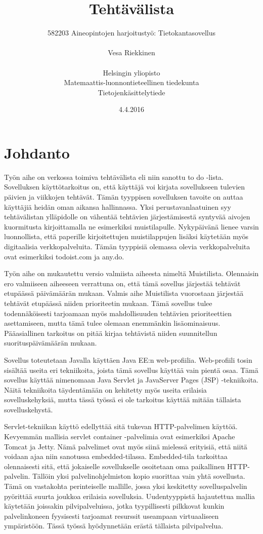\documentclass[12pt,a4paper,oneside,titlepage,pdftex]{article}
\title{Tehtävälista}
\date{4.4.2016}
\author{582203 Aineopintojen harjoitustyö: Tietokantasovellus\\ \\ Vesa Riekkinen\\ \\Helsingin yliopisto\\Matemaattis-luonnontieteellinen tiedekunta\\Tietojenkäsittelytiede}
\begin{document}
\maketitle

\setcounter{page}{1}
 
\section{Johdanto}

Työn aihe on verkossa toimiva tehtävälista eli niin sanottu to do -lista. Sovelluksen käyttötarkoitus on, että käyttäjä voi kirjata sovellukseen tulevien päivien ja viikkojen tehtävät. Tämän tyyppisen sovelluksen tavoite on auttaa käyttäjiä heidän oman aikansa hallinnassa. Yksi perustavanlaatuinen syy tehtävälistan ylläpidolle on vähentää tehtävien järjestämisestä syntyvää aivojen kuormitusta kirjoittamalla ne esimerkiksi muistilapulle. Nykypäivänä lienee varsin luonnollista, että paperille kirjoitettujen muistilappujen lisäksi käytetään myös digitaalisia verkkopalveluita. Tämän tyyppisiä olemassa olevia verkkopalveluita ovat esimerkiksi todoist.com ja any.do.

Työn aihe on mukautettu versio valmiista aiheesta nimeltä Muistilista. Olennaisin ero valmiiseen aiheeseen verrattuna on, että tämä sovellus järjestää tehtävät etupäässä päivämäärän mukaan. Valmis aihe Muistilista vuorostaan järjestää tehtävät etupäässä niiden prioriteetin mukaan. Tämä sovellus tulee todennäköisesti tarjoamaan myös mahdollisuuden tehtävien prioriteettien asettamiseen, mutta tämä tulee olemaan enemmänkin lisäominaisuus. Pääasiallinen tarkoitus on pitää kirjaa tehtävistä niiden suunnitellun suorituspäivämäärän mukaan.

Sovellus toteutetaan Javalla käyttäen Java EE:n web-profiilia. Web-profiili tosin sisältää useita eri tekniikoita, joista tämä sovellus käyttää vain pientä osaa. Tämä sovellus käyttää nimenomaan Java Servlet ja JavaServer Pages (JSP) -tekniikoita. Näitä tekniikoita täydentämään on kehitetty myös useita erilaisia sovelluskehyksiä, mutta tässä työssä ei ole tarkoitus käyttää mitään tällaista sovelluskehystä.

Servlet-tekniikan käyttö edellyttää sitä tukevan HTTP-palvelimen käyttöä. Kevyemmän mallisia servlet container -palvelimia ovat esimerkiksi Apache Tomcat ja Jetty. Nämä palvelimet ovat myös siinä mielessä erityisiä, että niitä voidaan ajaa niin sanotussa embedded-tilassa. Embedded-tila tarkoittaa olennaisesti sitä, että jokaiselle sovellukselle osoitetaan oma paikallinen HTTP-palvelin. Tällöin yksi palvelinohjelmiston kopio suorittaa vain yhtä sovellusta. Tämä on vastakohta perinteiselle mallille, jossa yksi keskitetty sovelluspalvelin pyörittää suurta joukkoa erilaisia sovelluksia. Uudentyyppistä hajautettua mallia käytetään joissakin pilvipalveluissa, jotka tyypillisesti pilkkovat kunkin palvelinkoneen fyysisesti tarjoamat resurssit useampaan virtuaaliseen ympäristöön. Tässä työssä hyödynnetään erästä tällaista pilvipalvelua.
\end{document}
